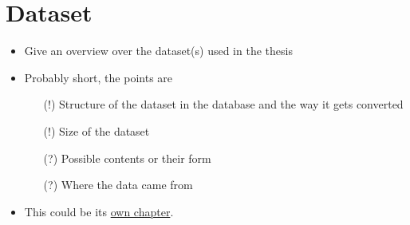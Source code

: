\section{Dataset}
\begin{itemize}
  \item Give an overview over the dataset(s) used in the thesis
  \item Probably short, the points are
        \begin{itemize}
          \item[(!)] Structure of the dataset in the database and the way it gets converted
          \item[(!)] Size of the dataset
          \item[(?)] Possible contents or their form
          \item[(?)] Where the data came from
        \end{itemize}
  \item This could be its \underline{own chapter}.
\end{itemize}
